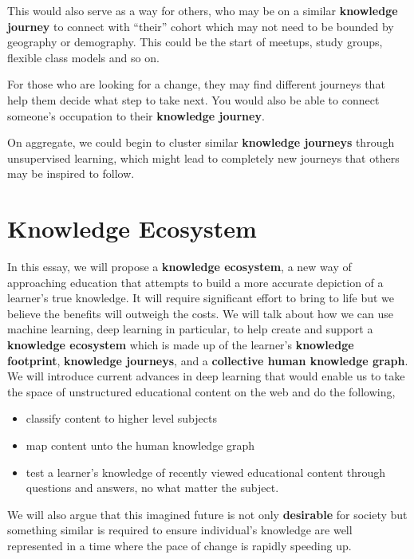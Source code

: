 \documentclass[]{book}
\theoremstyle{definition}
\theoremstyle{definition}
\theoremstyle{definition}
\theoremstyle{remark}
\begin{document}
This would also serve as a way for others, who may be on a similar
\textbf{knowledge journey} to connect with ``their'' cohort which may
not need to be bounded by geography or demography. This could be the
start of meetups, study groups, flexible class models and so on.

For those who are looking for a change, they may find different journeys
that help them decide what step to take next. You would also be able to
connect someone's occupation to their \textbf{knowledge journey}.

On aggregate, we could begin to cluster similar \textbf{knowledge
journeys} through unsupervised learning, which might lead to completely
new journeys that others may be inspired to follow.

\section{Knowledge Ecosystem}\label{knowledge-ecosystem}

In this essay, we will propose a \textbf{knowledge ecosystem}, a new way
of approaching education that attempts to build a more accurate
depiction of a learner's true knowledge. It will require significant
effort to bring to life but we believe the benefits will outweigh the
costs. We will talk about how we can use machine learning, deep learning
in particular, to help create and support a \textbf{knowledge ecosystem}
which is made up of the learner's \textbf{knowledge footprint},
\textbf{knowledge journeys}, and a \textbf{collective human knowledge
graph}. We will introduce current advances in deep learning that would
enable us to take the space of unstructured educational content on the
web and do the following,

\begin{itemize}
\item
  classify content to higher level subjects
\item
  map content unto the human knowledge graph
\item
  test a learner's knowledge of recently viewed educational content
  through questions and answers, no what matter the subject.
\end{itemize}

We will also argue that this imagined future is not only
\textbf{desirable} for society but something similar is required to
ensure individual's knowledge are well represented in a time where the
pace of change is rapidly speeding up.
\end{document}
